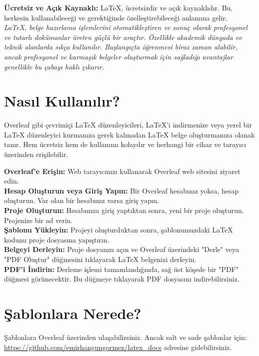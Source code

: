 \documentclass{article}
\begin{document}
\textbf{Ücretsiz ve Açık Kaynaklı:} LaTeX, ücretsizdir ve açık kaynaklıdır. Bu, herkesin kullanabileceği ve gerektiğinde özelleştirebileceği anlamına gelir.\\

\textit{LaTeX, belge hazırlama işlemlerini otomatikleştiren ve sonuç olarak profesyonel ve tutarlı dokümanlar üreten güçlü bir araçtır. Özellikle akademik dünyada ve teknik alanlarda sıkça kullanılır. Başlangıçta öğrenmesi biraz zaman alabilir, ancak profesyonel ve karmaşık belgeler oluşturmak için sağladığı avantajlar genellikle bu çabayı haklı çıkarır.}


\section{Nasıl Kullanılır?}
Overleaf gibi çevrimiçi LaTeX düzenleyicileri, LaTeX'i indirmenize veya yerel bir LaTeX düzenleyici kurmanıza gerek kalmadan LaTeX belge oluşturmanıza olanak tanır. Hem ücretsiz hem de kullanımı kolaydır ve herhangi bir cihaz ve tarayıcı üzerinden erişilebilir.

\textbf{Overleaf'e Erişin:} Web tarayıcınızı kullanarak Overleaf web sitesini ziyaret edin.\\

\textbf{Hesap Oluşturun veya Giriş Yapın:} Bir Overleaf hesabınız yoksa, hesap oluşturun. Var olan bir hesabınız varsa giriş yapın.\\

\textbf{Proje Oluşturun:} Hesabınıza giriş yaptıktan sonra, yeni bir proje oluşturun. Projenize bir ad verin.\\

\textbf{Şablonu Yükleyin:} Projeyi oluşturduktan sonra, şablonumuzdaki LaTeX kodunu proje dosyasına yapıştırın.\\

\textbf{Belgeyi Derleyin:} Proje dosyanızı açın ve Overleaf üzerindeki "Derle" veya "PDF Oluştur" düğmesini tıklayarak LaTeX belgenizi derleyin.\\

\textbf{PDF'i İndirin:} Derleme işlemi tamamlandığında, sağ üst köşede bir "PDF" düğmesi görünecektir. Bu düğmeye tıklayarak PDF dosyasını indirebilirsiniz.\\

\section{Şablonlara Nerede?}
Şablonlara Overleaf üzerinden ulaşabilirsiniz. Ancak salt ve sade şablonlar için:\\
\url{https://github.com/emirhangungormez/latex_docs} adresine gidebilirsiniz.
\end{document}
